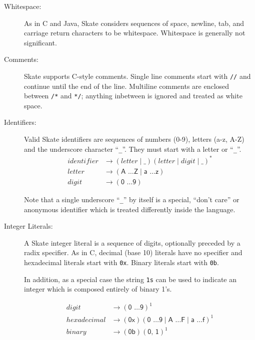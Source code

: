 \documentclass[a4paper,11pt,twoside]{report}
\begin{document}
{{\begin{description}
\item[Whitespace:]  As in C and Java, Skate considers sequences of
  space, newline, tab, and carriage return characters to be
  whitespace.  Whitespace is generally not significant. 

\item[Comments:] Skate supports C-style comments.  Single line comments
  start with \texttt{//} and continue until the end of the line.
  Multiline comments are enclosed between \texttt{/*} and \texttt{*/};
  anything inbetween is ignored and treated as white space.

\item[Identifiers:] Valid Skate identifiers are sequences of numbers
  (0-9), letters (a-z, A-Z) and the underscore character ``\texttt{\_}''.  They
  must start with a letter or ``\texttt{\_}''.  
  \begin{align*}
    identifier & \rightarrow ( letter \mid \_ ) (letter \mid digit \mid \_)^{\textrm{*}} \\
    letter & \rightarrow (\textsf{A \ldots Z} \mid  \textsf{a \ldots z})\\
    digit & \rightarrow (\textsf{0 \ldots 9})
\end{align*}

  Note that a single underscore ``\texttt{\_}'' by itself is a special,
  ``don't care'' or anonymous identifier which is treated differently
  inside the language. 
  
\item[Integer Literals:] A Skate integer literal is a sequence of
  digits, optionally preceded by a radix specifier.  As in C, decimal (base 10)
  literals have no specifier and hexadecimal literals start with
  \texttt{0x}.  Binary literals start with \texttt{0b}. 

  In addition, as a special case the string \texttt{1s} can be used to
  indicate an integer which is composed entirely of binary 1's. 

\begin{align*}
digit & \rightarrow (\textsf{0 \ldots 9})^{\textrm{1}}\\
hexadecimal & \rightarrow (\textsf{0x})(\textsf{0 \ldots 9} \mid \textsf{A \ldots F} \mid \textsf{a \ldots f})^{\textrm{1}}\\
binary & \rightarrow (\textsf{0b})(\textsf{0, 1})^{\textrm{1}}\\
\end{align*}



\end{description}}}
\end{document}
